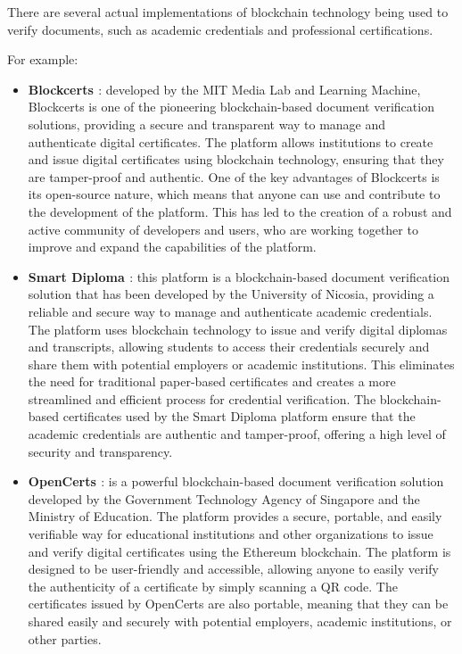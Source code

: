 \documentclass[target=mst,aauheader=]{thud}
\begin{document}
There are several actual implementations of blockchain technology being used to verify documents, such as academic credentials and professional certifications.
 
For example:

    \begin{itemize}

        \item \textbf{Blockcerts \cite{blockCerts}}: developed by the MIT Media Lab and Learning Machine, Blockcerts is one of the pioneering blockchain-based document verification solutions, providing a secure and transparent way to manage and authenticate digital certificates. The platform allows institutions to create and issue digital certificates using blockchain technology, ensuring that they are tamper-proof and authentic. One of the key advantages of Blockcerts is its open-source nature, which means that anyone can use and contribute to the development of the platform. This has led to the creation of a robust and active community of developers and users, who are working together to improve and expand the capabilities of the platform.
        \item \textbf{Smart Diploma \cite{smartDiploma}}: this platform is a blockchain-based document verification solution that has been developed by the University of Nicosia, providing a reliable and secure way to manage and authenticate academic credentials. The platform uses blockchain technology to issue and verify digital diplomas and transcripts, allowing students to access their credentials securely and share them with potential employers or academic institutions. This eliminates the need for traditional paper-based certificates and creates a more streamlined and efficient process for credential verification. The blockchain-based certificates used by the Smart Diploma platform ensure that the academic credentials are authentic and tamper-proof, offering a high level of security and transparency. 
        \item \textbf{OpenCerts \cite{opencerts}}: is a powerful blockchain-based document verification solution developed by the Government Technology Agency of Singapore and the Ministry of Education. The platform provides a secure, portable, and easily verifiable way for educational institutions and other organizations to issue and verify digital certificates using the Ethereum blockchain. The platform is designed to be user-friendly and accessible, allowing anyone to easily verify the authenticity of a certificate by simply scanning a QR code. The certificates issued by OpenCerts are also portable, meaning that they can be shared easily and securely with potential employers, academic institutions, or other parties.

\end{itemize}
\end{document}
